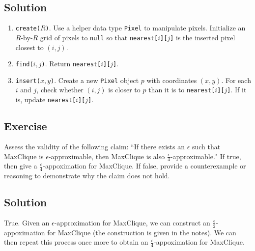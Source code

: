 \documentclass[14pt]{extreport}
\newcounter{counter}
\newcommand{\Exercise}{Exercise \stepcounter{counter}\thecounter}
\begin{document}
\subsection*{Solution}
    \begin{enumerate}
        \item \texttt{create($R$)}. Use a helper data type \texttt{Pixel} to manipulate pixels. Initialize an $R$-by-$R$ grid of pixels to \texttt{null} so that \texttt{nearest[$i$][$j$]} is the inserted pixel closest to $(i,j)$.
        \item \texttt{find($i,j$)}. Return \texttt{nearest[$i$][$j$]}.
        \item  \texttt{insert($x, y$)}. Create a new \texttt{Pixel} object $p$ with coordinates $(x, y)$. For each $i$ and $j$, check whether $(i,j)$ is closer to $p$ than it is to \texttt{nearest[$i$][$j$]}. If it is, update \texttt{nearest[$i$][$j$]}.
    \end{enumerate}

\subsection*{\Exercise}
    Assess the validity of the following claim: ``If there exists an $\epsilon$ such that \textsf{MaxClique} is $\epsilon$-approximable, then \textsf{MaxClique} is also $\frac{\epsilon}{4}$-approximable." If true, then give a $\frac{\epsilon}{4}$-appoximation for \textsf{MaxClique}. If false, provide a counterexample or reasoning to demonstrate why the claim does not hold.

\subsection*{Solution}
    True. Given an $\epsilon$-approximation for \textsf{MaxClique}, we can construct an $\frac{\epsilon}{2}$-appoximation for \textsf{MaxClique} (the construction is given in the notes). We can then repeat this process once more to obtain an $\frac{\epsilon}{4}$-appoximation for \textsf{MaxClique}.


\end{document}
